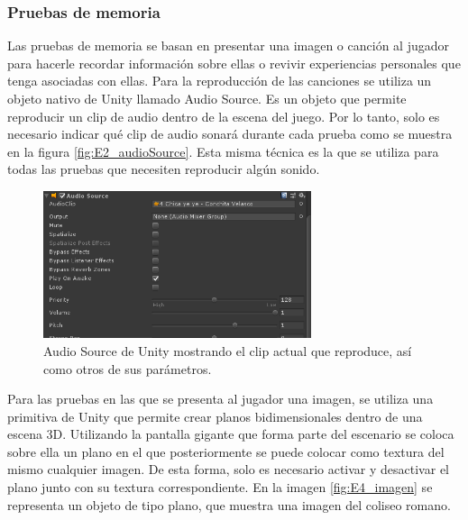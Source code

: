 \subsubsection{Pruebas de memoria}

Las pruebas de memoria se basan en presentar una imagen o canción al jugador para hacerle recordar información sobre ellas o revivir experiencias personales que tenga asociadas con ellas. Para la reproducción de las canciones se utiliza un objeto nativo de Unity llamado Audio Source. Es un objeto que permite reproducir un clip de audio dentro de la escena del juego. Por lo tanto, solo es necesario indicar qué clip de audio sonará durante cada prueba como se muestra en la figura \ref{fig:E2_audioSource}. Esta misma técnica es la que se utiliza para todas las pruebas que necesiten reproducir algún sonido.

\begin{figure}
  \centering
    \includegraphics[width=0.7\textwidth]{04.Desarrollo/04.Entrega4/02.Iteracion4_2/00.Figuras/04.audio_source.png}
    \caption{Audio Source de Unity mostrando el clip actual que reproduce, así como otros de sus parámetros.}
    \label{fig:E4_audioSource}
\end{figure}


Para las pruebas en las que se presenta al jugador una imagen, se utiliza una primitiva de Unity que permite crear planos bidimensionales dentro de una escena 3D. Utilizando la pantalla gigante que forma parte del escenario se coloca sobre ella un plano en el que posteriormente se puede colocar como textura del mismo cualquier imagen. De esta forma, solo es necesario activar y desactivar el plano junto con su textura correspondiente. En la imagen \ref{fig:E4_imagen} se representa un objeto de tipo plano, que muestra una imagen del coliseo romano.

